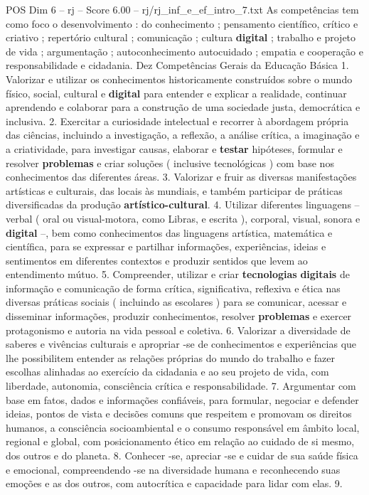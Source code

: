 \begin{textsample}{POS Dim 6 – rj – Score 6.00 – rj/rj\_inf\_e\_ef\_intro\_7.txt}
As competências tem como foco o desenvolvimento : do conhecimento ; pensamento científico, crítico e criativo ; repertório cultural ; comunicação ; cultura \textbf{digital} ; trabalho e projeto de vida ; argumentação ; autoconhecimento autocuidado ; empatia e cooperação e responsabilidade e cidadania.
Dez Competências Gerais da Educação Básica 1.
Valorizar e utilizar os conhecimentos historicamente construídos sobre o mundo físico, social, cultural e \textbf{digital} para entender e explicar a realidade, continuar aprendendo e colaborar para a construção de uma sociedade justa, democrática e inclusiva. 2.
Exercitar a curiosidade intelectual e recorrer à abordagem própria das ciências, incluindo a investigação, a reflexão, a análise crítica, a imaginação e a criatividade, para investigar causas, elaborar e \textbf{testar} hipóteses, formular e resolver \textbf{problemas} e criar soluções ( inclusive tecnológicas ) com base nos conhecimentos das diferentes áreas. 3.
Valorizar e fruir as diversas manifestações artísticas e culturais, das locais às mundiais, e também participar de práticas diversificadas da produção \textbf{artístico-cultural}. 4.
Utilizar diferentes linguagens – verbal ( oral ou visual-motora, como Libras, e escrita ), corporal, visual, sonora e \textbf{digital} –, bem como conhecimentos das linguagens artística, matemática e científica, para se expressar e partilhar informações, experiências, ideias e sentimentos em diferentes contextos e produzir sentidos que levem ao entendimento mútuo. 5.
Compreender, utilizar e criar \textbf{tecnologias} \textbf{digitais} de informação e comunicação de forma crítica, significativa, reflexiva e ética nas diversas práticas sociais ( incluindo as escolares ) para se comunicar, acessar e disseminar informações, produzir conhecimentos, resolver \textbf{problemas} e exercer protagonismo e autoria na vida pessoal e coletiva. 6.
Valorizar a diversidade de saberes e vivências culturais e apropriar -se de conhecimentos e experiências que lhe possibilitem entender as relações próprias do mundo do trabalho e fazer escolhas alinhadas ao exercício da cidadania e ao seu projeto de vida, com liberdade, autonomia, consciência crítica e responsabilidade. 7.
Argumentar com base em fatos, dados e informações confiáveis, para formular, negociar e defender ideias, pontos de vista e decisões comuns que respeitem e promovam os direitos humanos, a consciência socioambiental e o consumo responsável em âmbito local, regional e global, com posicionamento ético em relação ao cuidado de si mesmo, dos outros e do planeta. 8.
Conhecer -se, apreciar -se e cuidar de sua saúde física e emocional, compreendendo -se na diversidade humana e reconhecendo suas emoções e as dos outros, com autocrítica e capacidade para lidar com elas. 9.

\end{textsample}
